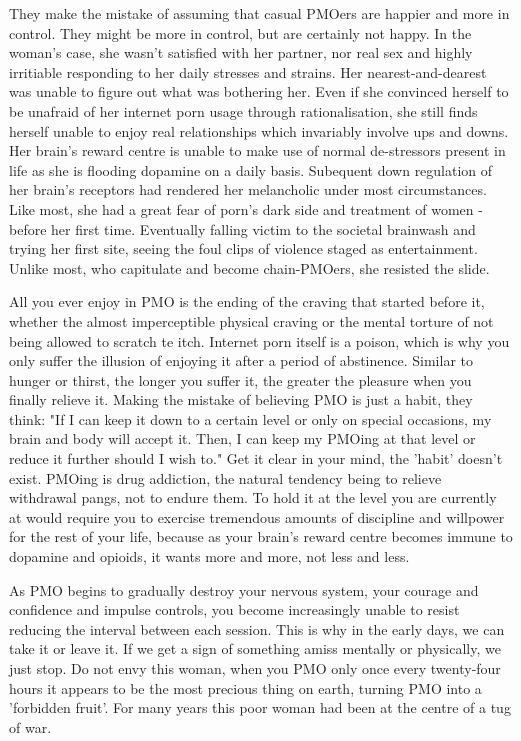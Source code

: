 \documentclass[easypeasy]{subfiles}
\begin{document}
They make the mistake of assuming that casual PMOers are happier and more in control. They might be more in control, but are certainly not happy. In the woman's case, she wasn't satisfied with her partner, nor real sex and highly irritiable responding to her daily stresses and strains. Her nearest-and-dearest was unable to figure out what was bothering her. Even if she convinced herself to be unafraid of her internet porn usage through rationalisation, she still finds herself unable to enjoy real relationships which invariably involve ups and downs. Her brain's reward centre is unable to make use of normal de-stressors present in life as she is flooding dopamine on a daily basis. Subequent down regulation of her brain's receptors had rendered her melancholic under most circumstances. Like most, she had a great fear of porn's dark side and treatment of women - before her first time. Eventually falling victim to the societal brainwash and trying her first site, seeing the foul clips of violence staged as entertainment. Unlike most, who capitulate and become chain-PMOers, she resisted the slide.

All you ever enjoy in PMO is the ending of the craving that started before it, whether the almost imperceptible physical craving or the mental torture of not being allowed to scratch te itch. Internet porn itself is a poison, which is why you only suffer the illusion of enjoying it after a period of abstinence. Similar to hunger or thirst, the longer you suffer it, the greater the pleasure when you finally relieve it. Making the mistake of believing PMO is just a habit, they think: "If I can keep it down to a certain level or only on special occasions, my brain and body will accept it. Then, I can keep my PMOing at that level or reduce it further should I wish to." Get it clear in your mind, the 'habit' doesn't exist. PMOing is drug addiction, the natural tendency being to relieve withdrawal pangs, not to endure them. To hold it at the level you are currently at would require you to exercise tremendous amounts of discipline and willpower for the rest of your life, because as your brain's reward centre becomes immune to dopamine and opioids, it wants more and more, not less and less. 

As PMO begins to gradually destroy your nervous system, your courage and confidence and impulse controls, you become increasingly unable to resist reducing the interval between each session. This is why in the early days, we can take it or leave it. If we get a sign of something amiss mentally or physically, we just stop. Do not envy this woman, when you PMO only once every twenty-four hours it appears to be the most precious thing on earth, turning PMO into a 'forbidden fruit'. For many years this poor woman had been at the centre of a tug of war.
\end{document}
